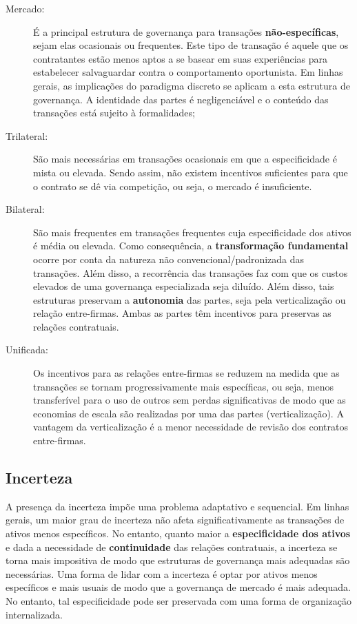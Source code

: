 \begin{description}
	\item[Mercado:] É a principal estrutura de governança para transações \textbf{não-específicas}, sejam elas ocasionais ou frequentes. Este tipo de transação é aquele que os contratantes estão menos aptos a se basear em suas experiências para estabelecer salvaguardar contra o comportamento oportunista. Em linhas gerais, as implicações do paradigma discreto se aplicam a esta estrutura de governança. A identidade das partes é negligenciável e o conteúdo das transações está sujeito à formalidades;
	\item[Trilateral:] São mais necessárias em transações ocasionais em que a especificidade é mista ou elevada. Sendo assim, não existem incentivos suficientes para que o contrato se dê via competição, ou seja, o mercado é insuficiente.
	\item[Bilateral:] São mais frequentes em transações frequentes cuja especificidade dos ativos é média ou elevada. Como consequência, a \textbf{transformação fundamental} ocorre por conta da natureza não convencional/padronizada das transações. Além disso, a recorrência das transações faz com que os custos elevados de uma governança especializada seja diluído. Além disso, tais estruturas preservam a \textbf{autonomia} das partes, seja pela verticalização ou relação entre-firmas. Ambas as partes têm incentivos para preservas as relações contratuais.
	\item[Unificada:] Os incentivos para as relações entre-firmas se reduzem na medida que as transações se tornam progressivamente mais específicas, ou seja, menos transferível para o uso de outros sem perdas significativas de modo que as economias de escala são realizadas por uma das partes (verticalização). A vantagem da verticalização é a menor necessidade de revisão dos contratos entre-firmas.
\end{description}

\subsection*{Incerteza}

A presença da incerteza impõe uma problema adaptativo e sequencial. Em linhas gerais, um maior grau de incerteza não afeta significativamente as transações de ativos menos específicos. No entanto, quanto maior a \textbf{especificidade dos ativos} e dada a necessidade de \textbf{continuidade} das relações contratuais, a incerteza se torna mais impositiva de modo que estruturas de governança mais adequadas são necessárias. Uma forma de lidar com a incerteza é optar por ativos menos específicos e mais usuais de modo que a governança de mercado é mais adequada. No entanto, tal especificidade pode ser preservada com uma forma de organização internalizada.

